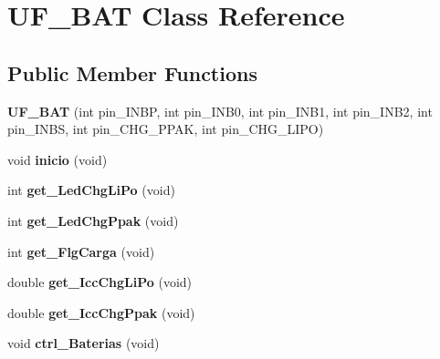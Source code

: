 \hypertarget{class_u_f___b_a_t}{}\section{U\+F\+\_\+\+B\+AT Class Reference}
\label{class_u_f___b_a_t}
\subsection*{Public Member Functions}
\begin{DoxyCompactItemize}
\item 
{\bfseries U\+F\+\_\+\+B\+AT} (int pin\+\_\+\+I\+N\+BP, int pin\+\_\+\+I\+N\+B0, int pin\+\_\+\+I\+N\+B1, int pin\+\_\+\+I\+N\+B2, int pin\+\_\+\+I\+N\+BS, int pin\+\_\+\+C\+H\+G\+\_\+\+P\+P\+AK, int pin\+\_\+\+C\+H\+G\+\_\+\+L\+I\+PO)\hypertarget{class_u_f___b_a_t_a66146c0dd245a976ad3208a4db2c357e}{}\label{class_u_f___b_a_t_a66146c0dd245a976ad3208a4db2c357e}

\item 
void {\bfseries inicio} (void)\hypertarget{class_u_f___b_a_t_ac66b917b3499d87eb1d80917cd454b7b}{}\label{class_u_f___b_a_t_ac66b917b3499d87eb1d80917cd454b7b}

\item 
int {\bfseries get\+\_\+\+Led\+Chg\+Li\+Po} (void)\hypertarget{class_u_f___b_a_t_a10d7c00822af5625f43912458ab42189}{}\label{class_u_f___b_a_t_a10d7c00822af5625f43912458ab42189}

\item 
int {\bfseries get\+\_\+\+Led\+Chg\+Ppak} (void)\hypertarget{class_u_f___b_a_t_ab9b658d9899d3f2176c51a6133fa9a5a}{}\label{class_u_f___b_a_t_ab9b658d9899d3f2176c51a6133fa9a5a}

\item 
int {\bfseries get\+\_\+\+Flg\+Carga} (void)\hypertarget{class_u_f___b_a_t_a582a35b01ecadbbcabde27ef8ca45cb3}{}\label{class_u_f___b_a_t_a582a35b01ecadbbcabde27ef8ca45cb3}

\item 
double {\bfseries get\+\_\+\+Icc\+Chg\+Li\+Po} (void)\hypertarget{class_u_f___b_a_t_a2997f3556212e5ac3a0a9dd638531823}{}\label{class_u_f___b_a_t_a2997f3556212e5ac3a0a9dd638531823}

\item 
double {\bfseries get\+\_\+\+Icc\+Chg\+Ppak} (void)\hypertarget{class_u_f___b_a_t_ae621f7703049d81780100240005a19ac}{}\label{class_u_f___b_a_t_ae621f7703049d81780100240005a19ac}

\item 
void {\bfseries ctrl\+\_\+\+Baterias} (void)\hypertarget{class_u_f___b_a_t_ad9c1369df7ca9911cd189e41d57a2cbf}{}\label{class_u_f___b_a_t_ad9c1369df7ca9911cd189e41d57a2cbf}

\end{DoxyCompactItemize}


